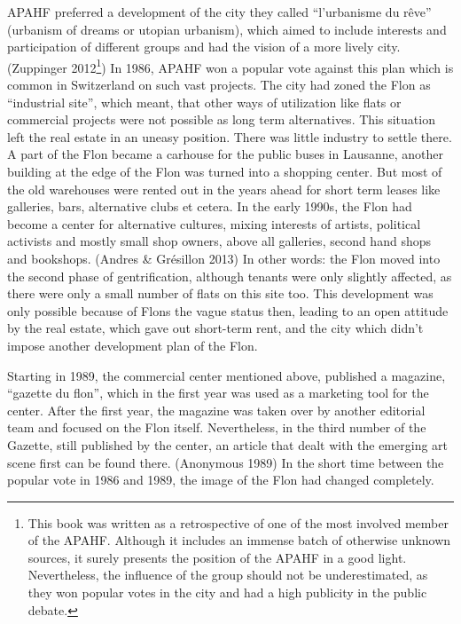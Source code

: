 \documentclass[a4paper,
fontsize=11pt,
oneside,
numbers=noperiodatend,
parskip=half-,
bibliography=totoc,
final
]{scrartcl}
\begin{document}
APAHF preferred a development of the city they called
\enquote{l'urbanisme du rêve} (urbanism of dreams or utopian urbanism),
which aimed to include interests and participation of different groups
and had the vision of a more lively city. (Zuppinger 2012\footnote{This
  book was written as a retrospective of one of the most involved member
  of the APAHF. Although it includes an immense batch of otherwise
  unknown sources, it surely presents the position of the APAHF in a
  good light. Nevertheless, the influence of the group should not be
  underestimated, as they won popular votes in the city and had a high
  publicity in the public debate.}) In 1986, APAHF won a popular vote
against this plan which is common in Switzerland on such vast projects.
The city had zoned the Flon as \enquote{industrial site}, which meant,
that other ways of utilization like flats or commercial projects were
not possible as long term alternatives. This situation left the real
estate in an uneasy position. There was little industry to settle there.
A part of the Flon became a carhouse for the public buses in Lausanne,
another building at the edge of the Flon was turned into a shopping
center. But most of the old warehouses were rented out in the years
ahead for short term leases like galleries, bars, alternative clubs et
cetera. In the early 1990s, the Flon had become a center for alternative
cultures, mixing interests of artists, political activists and mostly
small shop owners, above all galleries, second hand shops and bookshops.
(Andres \& Grésillon 2013) In other words: the Flon moved into the
second phase of gentrification, although tenants were only slightly
affected, as there were only a small number of flats on this site too.
This development was only possible because of Flons the vague status
then, leading to an open attitude by the real estate, which gave out
short-term rent, and the city which didn't impose another development
plan of the Flon.

Starting in 1989, the commercial center mentioned above, published a
magazine, \enquote{gazette du flon}, which in the first year was used as
a marketing tool for the center. After the first year, the magazine was
taken over by another editorial team and focused on the Flon itself.
Nevertheless, in the third number of the Gazette, still published by the
center, an article that dealt with the emerging art scene first can be
found there. (Anonymous 1989) In the short time between the popular vote
in 1986 and 1989, the image of the Flon had changed completely.
\end{document}
